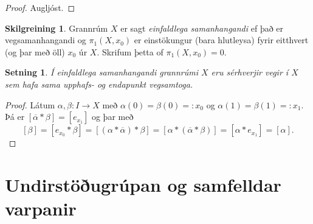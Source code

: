 \documentclass[a4paper,icelandic]{book}
\theoremstyle{definition}
\newtheorem{skilgr}{Skilgreining}[section]
\theoremstyle{plain}
\newtheorem{setn}{Setning}[section]
\theoremstyle{remark}
\begin{document}
\begin{proof}
  Augljóst.
\end{proof}
\begin{skilgr}
  Grannrúm $X$ er sagt \emph{einfaldlega samanhangandi} ef það er
  vegsamanhangandi og $\pi_1(X,x_0)$ er einstökungur (bara hlutleysa)
  fyrir eitthvert (og þar með öll) $x_0$ úr $X$. Skrifum þetta of
  $\pi_1(X,x_0)=0$.
\end{skilgr}
\begin{setn}
  Í einfaldlega samanhangandi grannrúmi $X$ eru sérhverjir vegir í $X$
  sem hafa sama upphafs- og endapunkt vegsamtoga.
\end{setn}
\begin{proof}
  Látum $\alpha,\beta:I\to X$ með $\alpha(0)=\beta(0) =: x_0$ og
  $\alpha(1)=\beta(1)=:x_1$. Þá er
  $[\overline\alpha*\beta]=[e_{x_1}]$ og þar með
  \[
  [\beta]
  =[e_{x_0}*\beta]
  =[(\alpha*\overline\alpha)*\beta]
  =[\alpha*(\overline\alpha*\beta)]
  =[\alpha*e_{x_1}]
  =[\alpha].
  \]
\end{proof}

\section{Undirstöðugrúpan og samfelldar varpanir}
\end{document}
